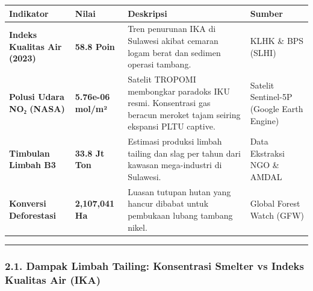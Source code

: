 \documentclass[
]{article}
\newcounter{none} %
\begin{document}
{\def\LTcaptype{none} %
\begin{longtable}[]{@{}
  >{\raggedright\arraybackslash}p{}
  >{\raggedright\arraybackslash}p{}
  >{\raggedright\arraybackslash}p{}
  >{\raggedright\arraybackslash}p{}@{}}
\toprule\noalign{}
\begin{minipage}[b]{\linewidth}\raggedright
Indikator
\end{minipage} & \begin{minipage}[b]{\linewidth}\raggedright
Nilai
\end{minipage} & \begin{minipage}[b]{\linewidth}\raggedright
Deskripsi
\end{minipage} & \begin{minipage}[b]{\linewidth}\raggedright
Sumber
\end{minipage} \\
\midrule\noalign{}
\endhead
\bottomrule\noalign{}
\endlastfoot
\textbf{Indeks Kualitas Air (2023)} & \textbf{58.8 Poin} & Tren
penurunan IKA di Sulawesi akibat cemaran logam berat dan sedimen operasi
tambang. & KLHK \& BPS (SLHI) \\
\textbf{Polusi Udara NO₂ (NASA)} & \textbf{5.76e-06 mol/m²} & Satelit
TROPOMI membongkar paradoks IKU resmi. Konsentrasi gas beracun meroket
tajam seiring ekspansi PLTU captive. & Satelit Sentinel-5P (Google Earth
Engine) \\
\textbf{Timbulan Limbah B3} & \textbf{33.8 Jt Ton} & Estimasi produksi
limbah tailing dan slag per tahun dari kawasan mega-industri di
Sulawesi. & Data Ekstraksi NGO \& AMDAL \\
\textbf{Konversi Deforestasi} & \textbf{2,107,041 Ha} & Luasan tutupan
hutan yang hancur dibabat untuk pembukaan lubang tambang nikel. & Global
Forest Watch (GFW) \\
\end{longtable}
}

\begin{center}\rule{0.5\linewidth}{0.5pt}\end{center}

\subsubsection{2.1. Dampak Limbah Tailing: Konsentrasi Smelter vs Indeks
Kualitas Air
(IKA)}\label{dampak-limbah-tailing-konsentrasi-smelter-vs-indeks-kualitas-air-ika}
\end{document}
